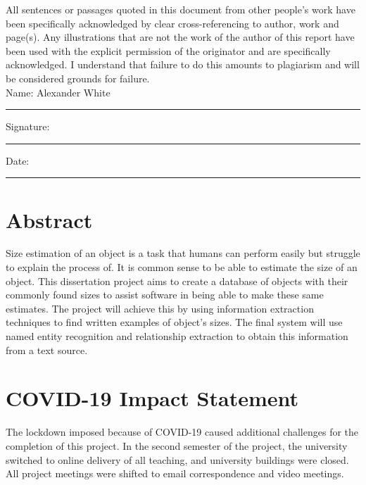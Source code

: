 \documentclass[11pt,oneside]{book}
\begin{document}
All sentences or passages quoted in this document from other people's work have been specifically acknowledged by clear cross-referencing to author, work and page(s).  Any illustrations that are not the work of the author of this report have been used with the explicit permission of the originator and are specifically acknowledged.  I understand that failure to do this amounts to plagiarism and will be considered grounds for failure.\\[1cm]

\noindent Name: Alexander White\\[1mm]
\rule[1em]{25em}{0.5pt}

\noindent Signature:\\[1mm]
\rule[1em]{25em}{0.5pt}

\noindent Date:\\[1mm]
\rule[1em]{25em}{0.5pt}



\chapter*{\Large \center Abstract}

Size estimation of an object is a task that humans can perform easily but struggle to explain the process of. It is common sense to be able to estimate the size of an object. This dissertation project aims to create a database of objects with their commonly found sizes to assist software in being able to make these same estimates. The project will achieve this by using information extraction techniques to find written examples of object's sizes. The final system will use named entity recognition and relationship extraction to obtain this information from a text source.

\chapter*{COVID-19 Impact Statement}
The lockdown imposed because of COVID-19 caused additional challenges for the completion of this project. In the second semester of the project, the university switched to online delivery of all teaching, and university buildings were closed. All project meetings were shifted to email correspondence and video meetings.

\end{document}
